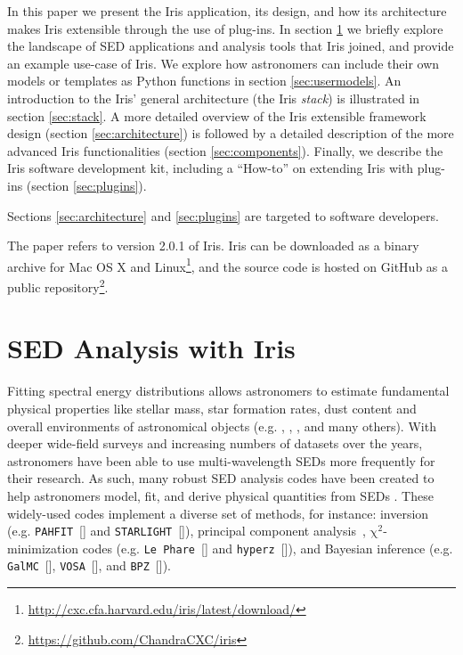 \documentclass[final,5p,authoryear]{elsarticle}
\begin{document}
In this paper we present the Iris application, its design, and how its
architecture makes Iris extensible through the use of plug-ins. In section
\ref{sec:overview} we briefly explore the landscape of SED applications and
analysis tools that Iris joined, and provide an example use-case of Iris. We
explore how astronomers can include their own models or templates as Python
functions in section \ref{sec:usermodels}. An introduction to the Iris' general
architecture (the Iris \emph{stack}) is illustrated in section \ref{sec:stack}.
A more detailed overview of the Iris extensible framework design (section
\ref{sec:architecture}) is followed by a detailed description of the more
advanced Iris functionalities (section \ref{sec:components}). Finally, we
describe the Iris software development kit, including a ``How-to'' on extending
Iris with plug-ins (section \ref{sec:plugins}).

Sections \ref{sec:architecture} and \ref{sec:plugins} are targeted to software
developers.

The paper refers to version 2.0.1 of Iris. Iris can be downloaded as a binary
archive for Mac OS X and
Linux\footnote{\url{http://cxc.cfa.harvard.edu/iris/latest/download/}}, and the
source code is hosted on GitHub as a public
repository\footnote{\url{https://github.com/ChandraCXC/iris}}.

\section{SED Analysis with Iris} \label{sec:overview}

Fitting spectral energy distributions allows astronomers to estimate fundamental
physical properties like stellar mass, star formation rates, dust content and
overall environments of astronomical objects (e.g. \citet{1998AJ....115.1329S},
\citet{2001ApJS..137..139S}, \citet{2007ApJS..169..328R}, and many others). With
deeper wide-field surveys and increasing numbers of datasets over the years,
astronomers have been able to use multi-wavelength SEDs more frequently for
their research. As such, many robust SED analysis codes have been created to
help astronomers model, fit, and derive physical quantities from SEDs
\citep{2011Ap&SS.331....1W,2013ARA&A..51..393C}. These widely-used codes
implement a diverse set of methods, for instance: inversion (e.g. 
\texttt{PAHFIT}~[\citealp{2007ApJ...656..770S}] and 
\texttt{STAR\-LIGHT}~[\citealp{2004MNRAS.355..273C}]),
principal component analysis~\citep[e.g.][]{2009MNRAS.394.1496B},
$\mathrm{\chi}^{2}$-minimization codes (e.g. \texttt{Le Phare}~[\citealp{1999MNRAS.310..540A}] and \texttt{hyperz}~[\citealp{2000A&A...363..476B}]), and Bayesian inference (e.g. \texttt{GalMC}~[\citealp{2011ApJ...737...47A}], 
\texttt{VOSA}~[\citealp{2008A&A...492..277B}], and  \texttt{BPZ}~[\citealp{2000ApJ...536..571B}]).
\end{document}
